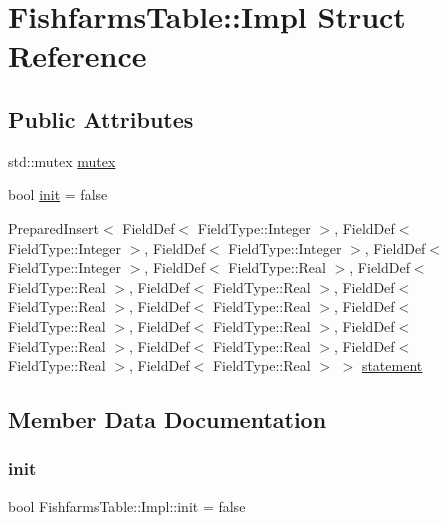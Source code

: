 \hypertarget{struct_fishfarms_table_1_1_impl}{}\section{Fishfarms\+Table\+::Impl Struct Reference}
\label{struct_fishfarms_table_1_1_impl}
\subsection*{Public Attributes}
\begin{DoxyCompactItemize}
\item 
std\+::mutex \mbox{\hyperlink{struct_fishfarms_table_1_1_impl_a52754885f0fe135eb3f741b74d196853}{mutex}}
\item 
bool \mbox{\hyperlink{struct_fishfarms_table_1_1_impl_a98cd8526c74c98584acf4f513a83533c}{init}} = false
\item 
Prepared\+Insert$<$ Field\+Def$<$ Field\+Type\+::\+Integer $>$, Field\+Def$<$ Field\+Type\+::\+Integer $>$, Field\+Def$<$ Field\+Type\+::\+Integer $>$, Field\+Def$<$ Field\+Type\+::\+Integer $>$, Field\+Def$<$ Field\+Type\+::\+Real $>$, Field\+Def$<$ Field\+Type\+::\+Real $>$, Field\+Def$<$ Field\+Type\+::\+Real $>$, Field\+Def$<$ Field\+Type\+::\+Real $>$, Field\+Def$<$ Field\+Type\+::\+Real $>$, Field\+Def$<$ Field\+Type\+::\+Real $>$, Field\+Def$<$ Field\+Type\+::\+Real $>$, Field\+Def$<$ Field\+Type\+::\+Real $>$, Field\+Def$<$ Field\+Type\+::\+Real $>$, Field\+Def$<$ Field\+Type\+::\+Real $>$, Field\+Def$<$ Field\+Type\+::\+Real $>$ $>$ \mbox{\hyperlink{struct_fishfarms_table_1_1_impl_afcbce81ec87987fe666c00f18f5c1ae7}{statement}}
\end{DoxyCompactItemize}


\subsection{Member Data Documentation}
\mbox{\label{struct_fishfarms_table_1_1_impl_a98cd8526c74c98584acf4f513a83533c}} 
\subsubsection{\texorpdfstring{init}{init}}
{\footnotesize\ttfamily bool Fishfarms\+Table\+::\+Impl\+::init = false}

